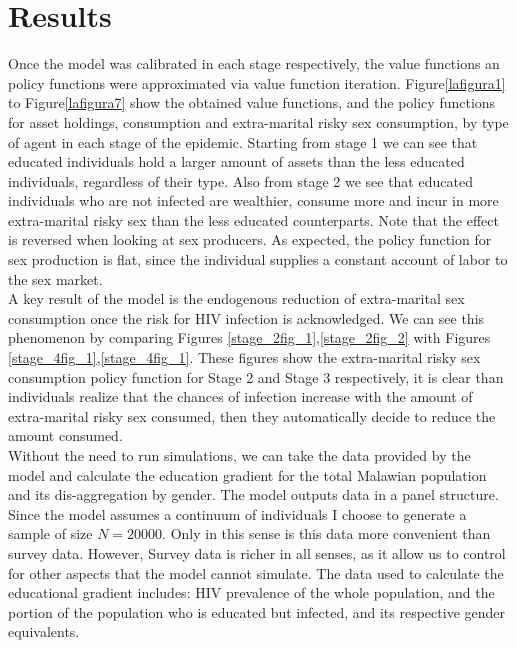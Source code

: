 \section{Results}\label{sec6}
Once the model was calibrated in each stage  respectively, the value functions an policy functions were approximated via value function iteration. Figure\ref{lafigura1} to Figure\ref{lafigura7} show the obtained value functions, and the policy functions for asset holdings, consumption and extra-marital risky sex consumption, by type of agent in each stage of the epidemic. Starting from stage 1 we can see that educated individuals hold a larger amount of assets than the less educated individuals, regardless of their type. Also from stage 2 we see that educated individuals who are not infected are wealthier, consume more and incur in more extra-marital risky sex than the less educated counterparts. Note that the effect is reversed when looking at sex producers. As expected, the policy function for sex production is flat, since the individual supplies a constant account of labor to the sex market.\\

A key result of the model is the endogenous reduction of extra-marital sex consumption once the risk for HIV infection is acknowledged. We can see this phenomenon by comparing Figures \ref{stage_2fig_1},\ref{stage_2fig_2} with Figures \ref{stage_4fig_1},\ref{stage_4fig_1}. These figures show the extra-marital risky sex consumption policy function for Stage 2 and Stage 3 respectively, it is clear than individuals realize that the chances of infection increase with the amount of extra-marital risky sex consumed, then they automatically decide to reduce the amount consumed. \\

Without the need to run simulations, we can take the data provided by the model and calculate the education gradient for the total Malawian population and its dis-aggregation by gender. The model outputs data in a panel structure. Since the model assumes a continuum of individuals I choose to generate a sample of size $N=20000$. Only in this sense is this data more convenient than  survey data. However, Survey data is richer in all senses, as it allow us to control for other aspects that the model cannot simulate. The data used to calculate the educational gradient includes:  HIV prevalence of the whole population, and the portion of the population who is educated but infected, and its respective gender equivalents. \\  

